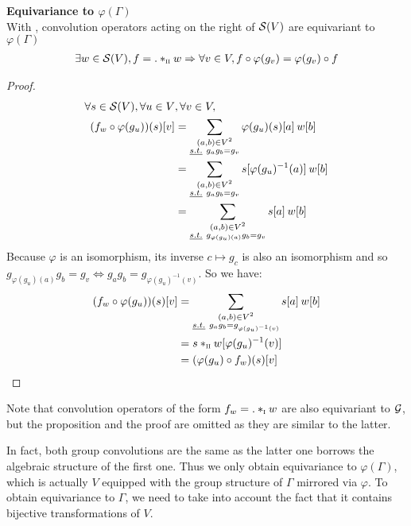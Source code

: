 \begin{proposition}\textbf{Equivariance to $\varphi(\Gamma)$}\\
With , convolution operators acting on the right of $\cs(V)$ are equivariant to $\varphi(\Gamma)$ \ie
\begin{gather*}
\exists w \in \cs(V), f = . \ast_{\II} w \Rightarrow \forall v \in V, f \circ \varphi(g_v) = \varphi(g_v) \circ f
\end{gather*}
\label{prop:equi}
\end{proposition}

\begin{proof}
\begin{align*}
\forall s \in \cs(V), \forall u \in V & ,\forall v \in V,\\
(f_w \circ \varphi(g_u)) (s) [v] & = \sum_{\substack{(a,b) \in V^2 \\ \st g_ag_b=g_v }} \varphi(g_u)(s)[a] \h{2} w[b]\\
& = \sum_{\substack{(a,b) \in V^2 \\ \st g_ag_b=g_v }} s[\varphi(g_u)^{-1}(a)] \h{2} w[b]\\
& = \sum_{\substack{(a,b) \in V^2 \\ \st g_{\varphi(g_u)(a)}g_b=g_v }} s[a] \h{2} w[b]\\
\end{align*}
Because $\varphi$ is an isomorphism, its inverse $c \mapsto g_c$ is also an isomorphism and so $g_{\varphi(g_u)(a)}g_b=g_v \Leftrightarrow g_{a}g_b=g_{\varphi(g_u)^{-1}(v)}$. So we have:
\begin{align*}
(f_w \circ \varphi(g_u)) (s) [v] & = \sum_{\substack{(a,b) \in V^2 \\ \st g_{a}g_b=g_{\varphi(g_u)^{-1}(v)} }} s[a] \h{2} w[b]\\
& = s \ast_{\II} w [\varphi(g_u)^{-1}(v)]\\
& = (\varphi(g_u) \circ f_w) (s) [v]
\end{align*}
\end{proof}

\begin{remark}Note that convolution operators of the form $f_w = . \ast_{\I} w$ are also equivariant to $\group$, but the proposition and the proof are omitted as they are similar to the latter.
\end{remark}

In fact, both group convolutions are the same as the latter one borrows the algebraic structure of the first one. Thus we only obtain equivariance to $\varphi(\Gamma)$, which is actually $V$ equipped with the group structure of $\Gamma$ mirrored via $\varphi$. To obtain equivariance to $\Gamma$, we need to take into account the fact that it contains bijective transformations of $V$.

